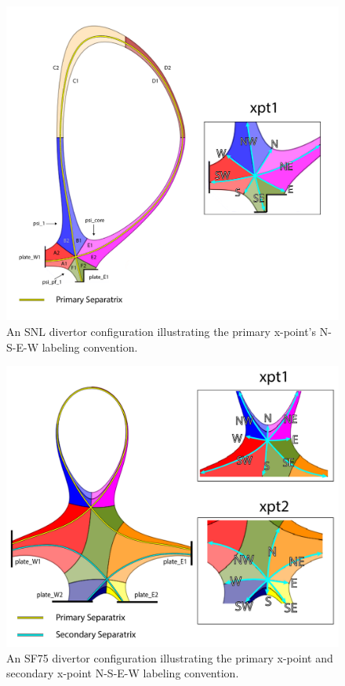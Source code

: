 \begin{figure}[H]
    \centering
    \includegraphics[width=\linewidth]{figures/xpt_1_directions.pdf}
    \caption{An SNL divertor configuration illustrating the primary x-point's N-S-E-W labeling convention.}
    \label{fig:xpt_1_directions}
\end{figure}

\begin{figure}[H]
    \centering
    \includegraphics[width=\linewidth]{figures/xpt_2_directions.pdf}
    \caption{An SF75 divertor configuration illustrating the primary x-point and secondary x-point N-S-E-W labeling convention.}
    \label{fig:xpt_2_directions}
\end{figure}

